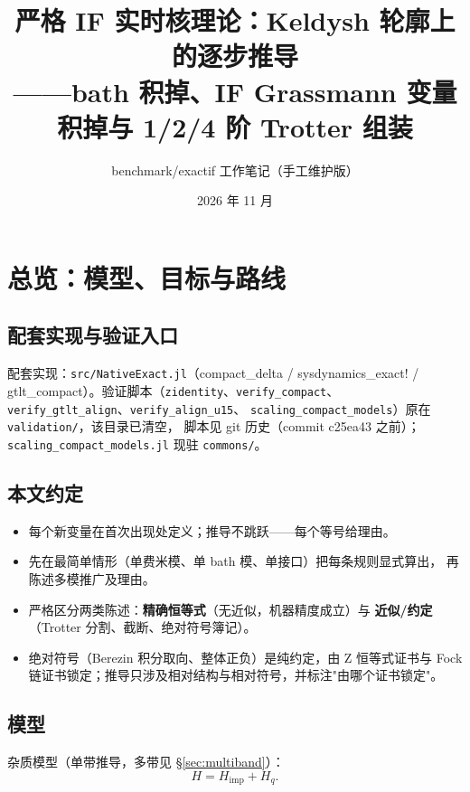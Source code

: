 \documentclass[11pt,a4paper]{ctexart}
\title{\textbf{严格 IF 实时核理论：Keldysh 轮廓上的逐步推导}\\[2pt]
\large ——bath 积掉、IF Grassmann 变量积掉与 1/2/4 阶 Trotter 组装}
\author{benchmark/exactif 工作笔记（手工维护版）}
\date{2026 年 11 月}
\theoremstyle{plain}
\theoremstyle{definition}
\theoremstyle{remark}
\begin{document}
\maketitle
\tableofcontents
\clearpage

\section{总览：模型、目标与路线}

\subsection{配套实现与验证入口}

配套实现：\texttt{src/NativeExact.jl}（compact\_delta / sysdynamics\_exact! /
gtlt\_compact）。验证脚本（\texttt{zidentity}、\texttt{verify\_compact}、
\texttt{verify\_gtlt\_align}、\texttt{verify\_align\_u15}、
\texttt{scaling\_compact\_models}）原在 \texttt{validation/}，该目录已清空，
脚本见 git 历史（commit c25ea43 之前）；\texttt{scaling\_compact\_models.jl}
现驻 \texttt{commons/}。

\subsection{本文约定}

\begin{itemize}
\item 每个新变量在首次出现处定义；推导不跳跃——每个等号给理由。
\item 先在最简单情形（单费米模、单 bath 模、单接口）把每条规则显式算出，
      再陈述多模推广及理由。
\item 严格区分两类陈述：\textbf{精确恒等式}（无近似，机器精度成立）与
      \textbf{近似/约定}（Trotter 分割、截断、绝对符号簿记）。
\item 绝对符号（Berezin 积分取向、整体正负）是纯约定，由 Z 恒等式证书与
      Fock 链证书锁定；推导只涉及相对结构与相对符号，并标注"由哪个证书锁定"。
\end{itemize}

\subsection{模型}

杂质模型（单带推导，多带见 \S\ref{sec:multiband}）：
\begin{equation}
H = H_{\mathrm{imp}} + H_q .
\label{eq:model}
\end{equation}
\end{document}
